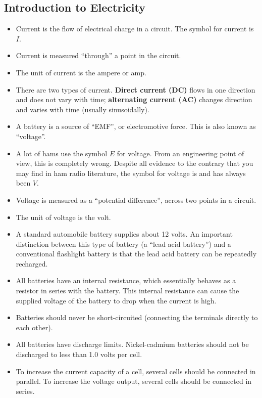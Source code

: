 \documentclass[letterpaper,12pt]{scrartcl}
\begin{document}
\subsection{Introduction to Electricity}

\begin{itemize}
\item Current is the flow of electrical charge in a circuit. The symbol for current is $I$.
\item Current is measured ``through'' a point in the circuit.
\item The unit of current is the ampere or amp.
\item There are two types of current. \textbf{Direct current (DC)} flows in one direction and does not vary with time; \textbf{alternating current (AC)} changes direction and varies
with time (usually sinusoidally).
\item A battery is a source of ``EMF'', or electromotive force. This is also known as ``voltage''.
\item A lot of hams use the symbol $E$ for voltage. From an engineering point of view, this is completely wrong.
Despite all evidence to the contrary that you may find in ham radio literature, the symbol for voltage is and has always been $V$.
\item Voltage is measured as a ``potential difference'', across two points in a circuit.
\item The unit of voltage is the volt.
\item A standard automobile battery supplies about 12 volts. An important distinction between this type of battery (a ``lead acid battery'') and a conventional flashlight
battery is that the lead acid battery can be repeatedly recharged.
\item All batteries have an internal resistance, which essentially behaves as a resistor in series with the battery.
This internal resistance can cause the supplied voltage of the battery to drop when the current is high.
\item Batteries should never be short-circuited (connecting the terminals directly to each other).
\item All batteries have discharge limits. Nickel-cadmium batteries should not be discharged to less than 1.0 volts per cell.
\item To increase the current capacity of a cell, several cells should be connected in parallel. To increase the voltage output, several cells should be connected in series.
\end{itemize}
\end{document}
